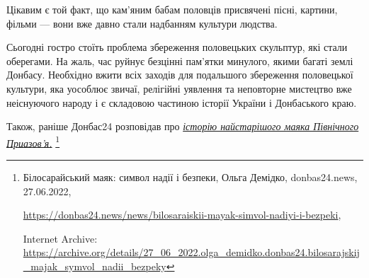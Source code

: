 
Цікавим є той факт, що кам'яним бабам половців присвячені пісні, картини,
фільми — вони вже давно стали надбанням культури людства.

Сьогодні гостро стоїть проблема збереження половецьких скульптур, які стали
оберегами. На жаль, час руйнує безцінні пам'ятки минулого, якими багаті землі
Донбасу. Необхідно вжити всіх заходів для подальшого збереження половецької
культури, яка уособлює звичаї, релігійні уявлення та неповторне мистецтво вже
неіснуючого народу і є складовою частиною історії України і Донбаського краю.


Також, раніше Донбас24 розповідав про \href{https://archive.org/details/27_06_2022.olga_demidko.donbas24.bilosarajskij_majak_symvol_nadii_bezpeky}{\emph{історію найстарішого маяка Північного Приазов'я.}}%
\footnote{Білосарайський маяк: символ надії і безпеки, Ольга Демідко, donbas24.news, 27.06.2022, %
\par\url{https://donbas24.news/news/bilosaraiskii-mayak-simvol-nadiyi-i-bezpeki}, \par%
Internet Archive: \url{https://archive.org/details/27_06_2022.olga_demidko.donbas24.bilosarajskij_majak_symvol_nadii_bezpeky}%
}

